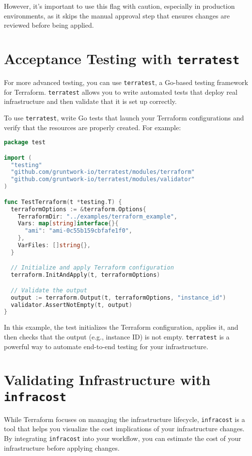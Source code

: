 However, it's important to use this flag with caution, especially in production environments, as it skips the manual approval step that ensures changes are reviewed before being applied.

\section{Acceptance Testing with \texttt{terratest}}

For more advanced testing, you can use \texttt{terratest}, a Go-based testing framework for Terraform. \texttt{terratest} allows you to write automated tests that deploy real infrastructure and then validate that it is set up correctly.

To use \texttt{terratest}, write Go tests that launch your Terraform configurations and verify that the resources are properly created. For example:

\begin{lstlisting}[language=go]
package test

import (
  "testing"
  "github.com/gruntwork-io/terratest/modules/terraform"
  "github.com/gruntwork-io/terratest/modules/validator"
)

func TestTerraform(t *testing.T) {
  terraformOptions := &terraform.Options{
    TerraformDir: "../examples/terraform_example",
    Vars: map[string]interface{}{
      "ami": "ami-0c55b159cbfafe1f0",
    },
    VarFiles: []string{},
  }

  // Initialize and apply Terraform configuration
  terraform.InitAndApply(t, terraformOptions)

  // Validate the output
  output := terraform.Output(t, terraformOptions, "instance_id")
  validator.AssertNotEmpty(t, output)
}
\end{lstlisting}

In this example, the test initializes the Terraform configuration, applies it, and then checks that the output (e.g., instance ID) is not empty. \texttt{terratest} is a powerful way to automate end-to-end testing for your infrastructure.

\section{Validating Infrastructure with \texttt{infracost}}

While Terraform focuses on managing the infrastructure lifecycle, \texttt{infracost} is a tool that helps you visualize the cost implications of your infrastructure changes. By integrating \texttt{infracost} into your workflow, you can estimate the cost of your infrastructure before applying changes.

